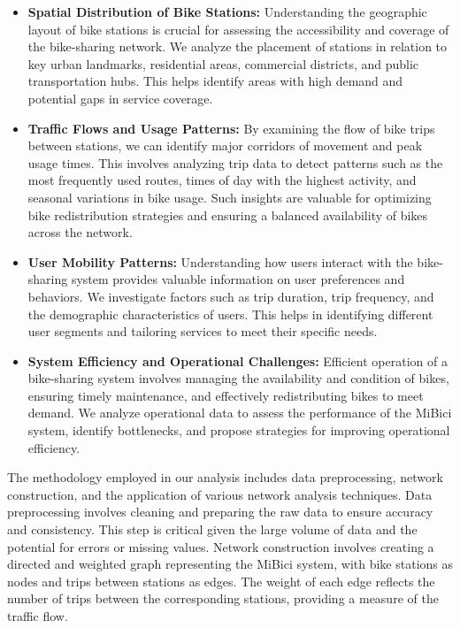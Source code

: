 \documentclass[conference]{IEEEtran}
\begin{document}
\begin{itemize}
    \item \textbf{Spatial Distribution of Bike Stations:} Understanding the geographic layout of bike stations is crucial for assessing the accessibility and coverage of the bike-sharing network. We analyze the placement of stations in relation to key urban landmarks, residential areas, commercial districts, and public transportation hubs. This helps identify areas with high demand and potential gaps in service coverage.

    \item \textbf{Traffic Flows and Usage Patterns:} By examining the flow of bike trips between stations, we can identify major corridors of movement and peak usage times. This involves analyzing trip data to detect patterns such as the most frequently used routes, times of day with the highest activity, and seasonal variations in bike usage. Such insights are valuable for optimizing bike redistribution strategies and ensuring a balanced availability of bikes across the network.

    \item \textbf{User Mobility Patterns:} Understanding how users interact with the bike-sharing system provides valuable information on user preferences and behaviors. We investigate factors such as trip duration, trip frequency, and the demographic characteristics of users. This helps in identifying different user segments and tailoring services to meet their specific needs.

    \item \textbf{System Efficiency and Operational Challenges:} Efficient operation of a bike-sharing system involves managing the availability and condition of bikes, ensuring timely maintenance, and effectively redistributing bikes to meet demand. We analyze operational data to assess the performance of the MiBici system, identify bottlenecks, and propose strategies for improving operational efficiency.
\end{itemize}

The methodology employed in our analysis includes data preprocessing, network construction, and the application of various network analysis techniques. Data preprocessing involves cleaning and preparing the raw data to ensure accuracy and consistency. This step is critical given the large volume of data and the potential for errors or missing values. Network construction involves creating a directed and weighted graph representing the MiBici system, with bike stations as nodes and trips between stations as edges. The weight of each edge reflects the number of trips between the corresponding stations, providing a measure of the traffic flow.
\end{document}
